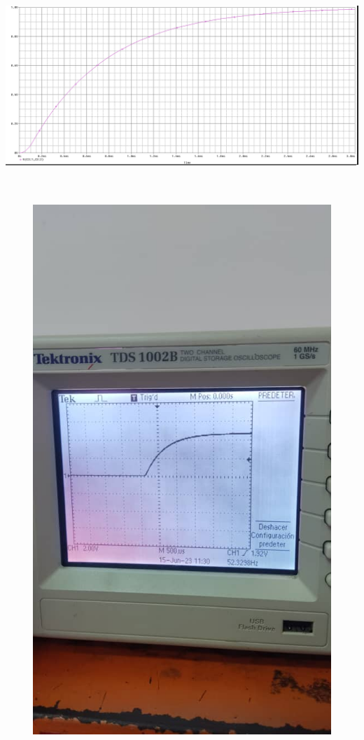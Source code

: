\documentclass[12pt]{article}
\begin{document}
\begin{enumerate}
\begin{itemize}
    		\begin{center}
    			\includegraphics[width=16cm,height=8cm]{Img/sobreamor_2}
    		\end{center}
    		
    		\begin{center}
    			\includegraphics[width=16cm,height=20cm]{Img/sobreamor_lab2}
    		\end{center}
    	\end{itemize}
    	

\end{enumerate}
\end{document}
